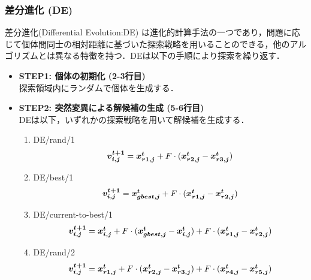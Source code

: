 \documentclass[a4j,11pt]{jarticle}
\begin{document}
\subsubsection{差分進化 (DE)}
\label{sss:DE}


差分進化(Differential Evolution:DE) \cite{DE} は進化的計算手法の一つであり，問題に応じて個体間同士の相対距離に基づいた探索戦略を用いることのできる，他のアルゴリズムとは異なる特徴を持つ．DEは以下の手順により探索を繰り返す．
\begin{itemize}
\item {\bf STEP1: 個体の初期化 (2-3行目)} \\
探索領域内にランダムで個体を生成する．
\item {\bf STEP2: 突然変異による解候補の生成 (5-6行目)} \\
DEは以下，いずれかの探索戦略を用いて解候補を生成する．
\begin{enumerate}
\item{DE/rand/1}
\begin{equation}
\label{eq:rand1}
\mbox{\boldmath $v_{i,j}^{t+1}$}=\mbox{\boldmath $x_{r1,j}^t$}+F \cdot (\mbox{\boldmath $x_{r2,j}^t$}-\mbox{\boldmath $x_{r3,j}^t$})
\end{equation}
\item{DE/best/1}
\begin{equation}
\label{eq:best1}
\mbox{\boldmath $v_{i,j}^{t+1}$}=\mbox{\boldmath $x_{gbest,j}^t$}+F \cdot (\mbox{\boldmath $x_{r1,j}^t$}-\mbox{\boldmath $x_{r2,j}^t$})
\end{equation}
\item{DE/current-to-best/1}
\begin{equation}
\label{eq:cur2best1}
\mbox{\boldmath $v_{i,j}^{t+1}$}=\mbox{\boldmath $x_{i,j}^t$}+F \cdot (\mbox{\boldmath $x_{gbest,j}^t$}-\mbox{\boldmath $x_{i,j}^t$})+F \cdot (\mbox{\boldmath $x_{r1,j}^t$}-\mbox{\boldmath $x_{r2,j}^t$})
\end{equation}
\item{DE/rand/2}
\begin{equation}
\label{eq:rand2}
\mbox{\boldmath $v_{i,j}^{t+1}$}=\mbox{\boldmath $x_{r1,j}^t$}+F \cdot (\mbox{\boldmath $x_{r2,j}^t$}-\mbox{\boldmath $x_{r3,j}^t$})+F\cdot (\mbox{\boldmath $x_{r4,j}^t$}-\mbox{\boldmath $x_{r5,j}^t$})
\end{equation}

\end{enumerate}
\end{itemize}
\end{document}
